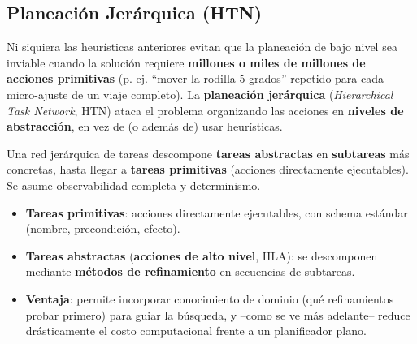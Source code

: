 \subsection{Planeación Jerárquica (HTN)}

Ni siquiera las heurísticas anteriores evitan que la planeación de bajo nivel sea inviable cuando la
solución requiere \textbf{millones o miles de millones de acciones primitivas} (p. ej. ``mover la
rodilla 5 grados'' repetido para cada micro-ajuste de un viaje completo). La
\textbf{planeación jerárquica} (\textit{Hierarchical Task Network}, HTN) ataca el problema
organizando las acciones en \textbf{niveles de abstracción}, en vez de (o además de) usar
heurísticas.

\begin{definition}[HTN]
Una red jerárquica de tareas descompone \textbf{tareas abstractas} en \textbf{subtareas} más
concretas, hasta llegar a \textbf{tareas primitivas} (acciones directamente ejecutables). Se asume
observabilidad completa y determinismo.
\end{definition}

\begin{itemize}
    \item \textbf{Tareas primitivas}: acciones directamente ejecutables, con schema estándar
    (nombre, precondición, efecto).
    \item \textbf{Tareas abstractas} (\textbf{acciones de alto nivel}, HLA): se descomponen mediante
    \textbf{métodos de refinamiento} en secuencias de subtareas.
    \item \textbf{Ventaja}: permite incorporar conocimiento de dominio (qué refinamientos probar
    primero) para guiar la búsqueda, y --como se ve más adelante-- reduce drásticamente el costo
    computacional frente a un planificador plano.
\end{itemize}

